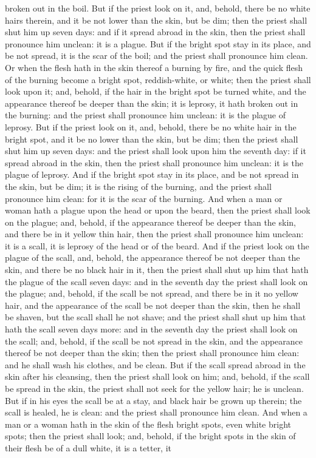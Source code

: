 broken out in the boil. But if the priest look on it, and, behold, there be no white hairs therein, and it be not lower than the skin, but be dim; then the priest shall shut him up seven days: and if it spread abroad in the skin, then the priest shall pronounce him unclean: it is a plague. But if the bright spot stay in its place, and be not spread, it is the scar of the boil; and the priest shall pronounce him clean.  Or when the flesh hath in the skin thereof a burning by fire, and the quick flesh of the burning become a bright spot, reddish-white, or white; then the priest shall look upon it; and, behold, if the hair in the bright spot be turned white, and the appearance thereof be deeper than the skin; it is leprosy, it hath broken out in the burning: and the priest shall pronounce him unclean: it is the plague of leprosy. But if the priest look on it, and, behold, there be no white hair in the bright spot, and it be no lower than the skin, but be dim; then the priest shall shut him up seven days: and the priest shall look upon him the seventh day: if it spread abroad in the skin, then the priest shall pronounce him unclean: it is the plague of leprosy. And if the bright spot stay in its place, and be not spread in the skin, but be dim; it is the rising of the burning, and the priest shall pronounce him clean: for it is the scar of the burning.  And when a man or woman hath a plague upon the head or upon the beard, then the priest shall look on the plague; and, behold, if the appearance thereof be deeper than the skin, and there be in it yellow thin hair, then the priest shall pronounce him unclean: it is a scall, it is leprosy of the head or of the beard. And if the priest look on the plague of the scall, and, behold, the appearance thereof be not deeper than the skin, and there be no black hair in it, then the priest shall shut up him that hath the plague of the scall seven days: and in the seventh day the priest shall look on the plague; and, behold, if the scall be not spread, and there be in it no yellow hair, and the appearance of the scall be not deeper than the skin, then he shall be shaven, but the scall shall he not shave; and the priest shall shut up him that hath the scall seven days more: and in the seventh day the priest shall look on the scall; and, behold, if the scall be not spread in the skin, and the appearance thereof be not deeper than the skin; then the priest shall pronounce him clean: and he shall wash his clothes, and be clean. But if the scall spread abroad in the skin after his cleansing, then the priest shall look on him; and, behold, if the scall be spread in the skin, the priest shall not seek for the yellow hair; he is unclean. But if in his eyes the scall be at a stay, and black hair be grown up therein; the scall is healed, he is clean: and the priest shall pronounce him clean.  And when a man or a woman hath in the skin of the flesh bright spots, even white bright spots; then the priest shall look; and, behold, if the bright spots in the skin of their flesh be of a dull white, it is a tetter, it 